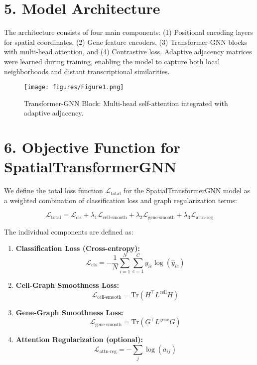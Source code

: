 \documentclass[unnumsec,webpdf,contemporary,medium]{oup-authoring-template}
\begin{document}
\section*{5. Model Architecture}
The architecture consists of four main components: (1) Positional encoding layers for spatial coordinates, (2) Gene feature encoders, (3) Transformer-GNN blocks with multi-head attention, and (4) Contrastive loss. Adaptive adjacency matrices were learned during training, enabling the model to capture both local neighborhoods and distant transcriptional similarities.
\begin{figure}[h!]
  \centering
  \texttt{[image: figures/Figure1.png]}
  \caption{Transformer-GNN Block: Multi-head self-attention integrated with adaptive adjacency.}
  \label{fig:transformer_gnn_block}
\end{figure}

\section*{6. Objective Function for SpatialTransformerGNN}

We define the total loss function $\mathcal{L}_{\text{total}}$ for the SpatialTransformerGNN model as a weighted combination of classification loss and graph regularization terms:

\begin{equation}
\mathcal{L}_{\text{total}} = \mathcal{L}_{\text{cls}} + \lambda_1 \mathcal{L}_{\text{cell-smooth}} + \lambda_2 \mathcal{L}_{\text{gene-smooth}} + \lambda_3 \mathcal{L}_{\text{attn-reg}}
\end{equation}

\noindent The individual components are defined as:

\begin{enumerate}
    \item \textbf{Classification Loss (Cross-entropy):}
    \begin{equation}
    \mathcal{L}_{\text{cls}} = -\frac{1}{N} \sum_{i=1}^{N} \sum_{c=1}^{C} y_{ic} \log(\hat{y}_{ic})
    \end{equation}

    \item \textbf{Cell-Graph Smoothness Loss:}
    \begin{equation}
    \mathcal{L}_{\text{cell-smooth}} = \text{Tr}(H^{\top} L^{\text{cell}} H)
    \end{equation}

    \item \textbf{Gene-Graph Smoothness Loss:}
    \begin{equation}
    \mathcal{L}_{\text{gene-smooth}} = \text{Tr}(G^{\top} L^{\text{gene}} G)
    \end{equation}

    \item \textbf{Attention Regularization (optional):}
    \begin{equation}
    \mathcal{L}_{\text{attn-reg}} = - \sum_{j} \log(a_{ij})
    \end{equation}
\end{enumerate}
\end{document}
